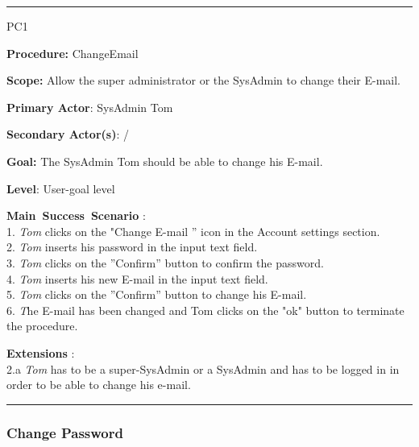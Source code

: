 \hrule
\vspace{0.5cm}
\begin{lyxlist}{PC1}
\small{
\item [\textbf{Procedure:}] ChangeEmail 
\item [\textbf{Scope:}] Allow the super administrator or the SysAdmin to change
their E-mail.
\item [\textbf{Primary Actor}:] SysAdmin Tom
\item [\textbf{Secondary Actor(s)}:] /
\item [\textbf{Goal:}] The SysAdmin Tom should be able to change his E-mail.
\item [\textbf{Level}:] User-goal level
\item [\textbf{Main~Success~Scenario}]:\\
1. \emph{Tom} clicks on the "Change E-mail '' icon in the Account settings
section.\\
2. \emph{Tom} inserts his password in the input text field.\\
3. \emph{Tom} clicks on the ''Confirm'' button to confirm the password.\\
4. \emph{Tom} inserts his new E-mail in the input text field.\\
5. \emph{Tom} clicks on the ''Confirm'' button to change his E-mail.\\
6. \emph The E-mail has been changed and {Tom} clicks on the "ok" button to
terminate the procedure.\\

\item [\textbf{Extensions}]:\\
2.a \emph{Tom} has to be a super-SysAdmin or a SysAdmin and has to be logged in
in order to be able to change his e-mail.\\
}
\end{lyxlist}
\hrule


\subsubsection{Change Password}

